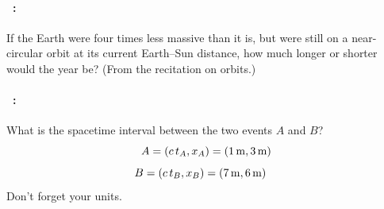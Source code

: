 \documentclass[12pt]{article} 
\begin{document}
\paragraph{\problemname~\theproblem:}%
If the Earth were four times less massive than it is, but were still
on a near-circular orbit at its current Earth--Sun distance, how much
longer or shorter would the year be? (From the recitation on orbits.)

\vfill

\paragraph{\problemname~\theproblem:}%
What is the spacetime interval between the two events $A$ and $B$?
$$A = (c\,t_A, x_A) = (1\,\mathrm{m}, 3\,\mathrm{m}) $$
$$B = (c\,t_B, x_B) = (7\,\mathrm{m}, 6\,\mathrm{m})\quad $$
Don't forget your units.

\vfill
~
\end{document}
